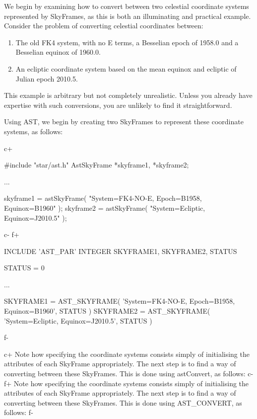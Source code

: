 \documentclass[twoside,11pt]{starlink}
\begin{document}
We begin by examining how to convert between two celestial coordinate
systems represented by SkyFrames, as this is both an illuminating and
practical example.  Consider the problem of converting celestial
coordinates between:

\begin{enumerate}
\item The old FK4 system, with no E terms, a Besselian epoch of
1958.0 and a Besselian equinox of 1960.0.

\item An ecliptic coordinate system based on the mean equinox and
ecliptic of Julian epoch 2010.5.
\end{enumerate}

This example is arbitrary but not completely unrealistic. Unless you
already have expertise with such conversions, you are unlikely to find
it straightforward.

Using AST, we begin by creating two SkyFrames to represent these
coordinate systems, as follows:

c+
\small
\begin{terminalv}
#include "star/ast.h"
AstSkyFrame *skyframe1, *skyframe2;

...

skyframe1 = astSkyFrame( "System=FK4-NO-E, Epoch=B1958, Equinox=B1960" );
skyframe2 = astSkyFrame( "System=Ecliptic, Equinox=J2010.5" );
\end{terminalv}
\normalsize
c-
f+
\small
\begin{terminalv}
      INCLUDE 'AST_PAR'
      INTEGER SKYFRAME1, SKYFRAME2, STATUS

      STATUS = 0

      ...

      SKYFRAME1 = AST_SKYFRAME( 'System=FK4-NO-E, Epoch=B1958, Equinox=B1960', STATUS )
      SKYFRAME2 = AST_SKYFRAME( 'System=Ecliptic, Equinox=J2010.5', STATUS )
\end{terminalv}
\normalsize
f-

c+
Note how specifying the coordinate systems consists simply of
initialising the attributes of each SkyFrame appropriately.  The next
step is to find a way of converting between these SkyFrames. This is
done using astConvert, as follows:
c-
f+
Note how specifying the coordinate systems consists simply of
initialising the attributes of each SkyFrame appropriately.  The next
step is to find a way of converting between these SkyFrames. This is
done using AST\_CONVERT, as follows:
f-
\end{document}

